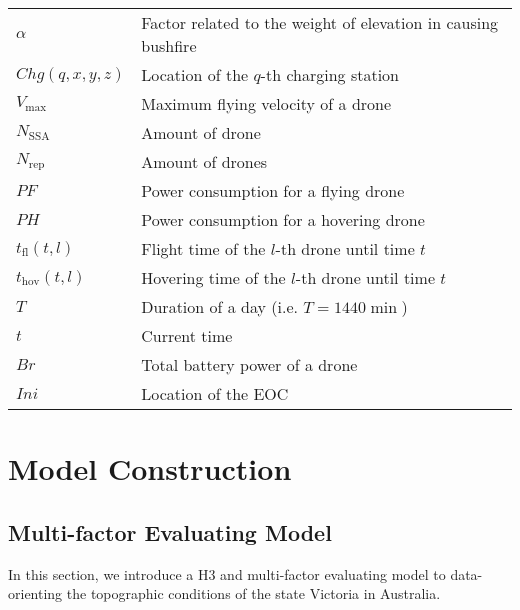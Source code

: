 \documentclass[13pt]{ctexart} %
\begin{document}
\begin{table}[h]
\begin{tabular}{>{\centering\arraybackslash}p{6em}>{\centering\arraybackslash}p{30em}}
        $\alpha$         & Factor related to the weight
        of elevation in causing bushfire                           \\
        $Chg
        (q,x,y,z)$       & Location of the $q$-th charging station \\
        $V_{\text{max}}$ & Maximum flying velocity of a drone      \\
        $N_{\text{SSA}}$ & Amount of drone
        \uppercase\expandafter{\romannumeral1}                     \\
        $N_{\text{rep}}$ & Amount of drones
        \uppercase\expandafter{\romannumeral2}                     \\
        $PF$             & Power consumption for a flying drone    \\
        $PH$             & Power consumption for a hovering drone  \\
        $t_{\text{fl}}
        (t,l)$           & Flight time of the $l$-th drone
        until time $t$                                             \\
        $t_{\text{hov}}
        (t,l)$           & Hovering time of the $l$-th drone
        until time $t$                                             \\
        $T$              & Duration of a day (i.e. $T=1440 \min$)  \\
        $t$              & Current time                            \\
        $Br$             & Total battery power of a drone          \\
        $Ini$            & Location of the EOC                     \\
        \bottomrule
    \end{tabular}
\end{table}
\section{Model Construction}
\subsection{Multi-factor Evaluating Model}
In this section, we introduce a H3 and multi-factor evaluating model to data-orienting the topographic conditions of the state Victoria in Australia.
\end{document}
